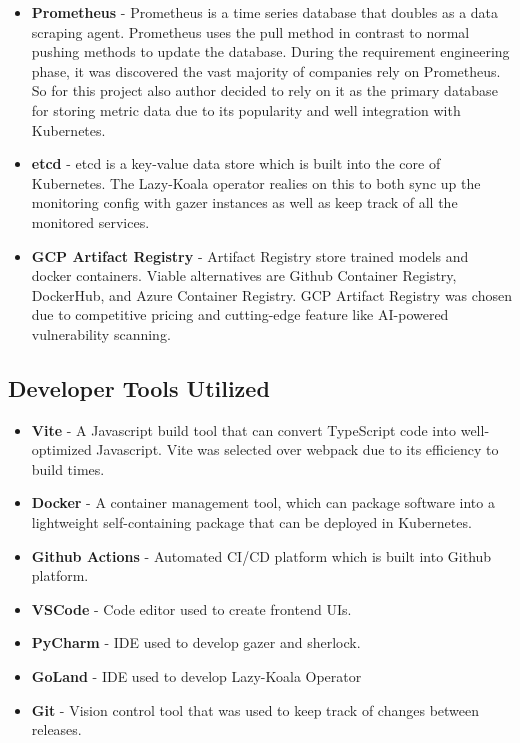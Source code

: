 \begin{itemize}
    \item \textbf{Prometheus} - Prometheus is a time series database that doubles as a data scraping agent. Prometheus uses the pull method in contrast to normal pushing methods to update the database. During the requirement engineering phase, it was discovered the vast majority of companies rely on Prometheus. So for this project also author decided to rely on it as the primary database for storing metric data due to its popularity and well integration with Kubernetes.
    \item \textbf{etcd} - etcd is a key-value data store which is built into the core of Kubernetes. The Lazy-Koala operator realies on this to both sync up the monitoring config with gazer instances as well as keep track of all the monitored services.
    \item \textbf{GCP Artifact Registry} - Artifact Registry store trained models and docker containers. Viable alternatives are Github Container Registry, DockerHub, and Azure Container Registry. GCP Artifact Registry was chosen due to competitive pricing and cutting-edge feature like AI-powered vulnerability scanning. 
\end{itemize}

\subsection{Developer Tools Utilized}
\begin{itemize}
    \item \textbf{Vite} - A Javascript build tool that can convert TypeScript code into well-optimized Javascript. Vite was selected over webpack due to its efficiency to build times.
    \item \textbf{Docker} - A container management tool, which can package software into a lightweight self-containing package that can be deployed in Kubernetes.
    \item \textbf{Github Actions} - Automated CI/CD platform which is built into Github platform.
    \item \textbf{VSCode} - Code editor used to create frontend UIs.
    \item \textbf{PyCharm} - IDE used to develop gazer and sherlock.
    \item \textbf{GoLand} - IDE used to develop Lazy-Koala Operator
    \item \textbf{Git} - Vision control tool that was used to keep track of changes between releases.
\end{itemize}

